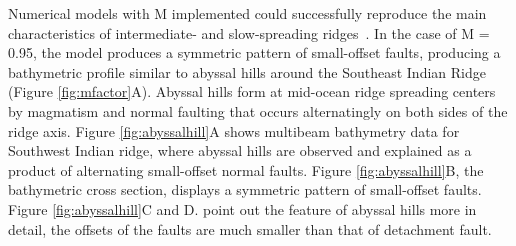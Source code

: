 \documentclass[letterpaper,12pt,notitle]{memphisthesis}                     %
\begin{document}
Numerical models with M implemented could successfully reproduce the main characteristics of intermediate- and slow-spreading ridges~\citep{Buck2005}. In the case of M = 0.95, the model produces a symmetric pattern of small-offset faults, producing a bathymetric profile similar to abyssal hills around the Southeast Indian Ridge (Figure \ref{fig:mfactor}A). Abyssal hills form at mid-ocean ridge spreading centers by magmatism and normal faulting that occurs alternatingly on both sides of the ridge axis. Figure \ref{fig:abyssalhill}A shows multibeam bathymetry data for Southwest Indian ridge, where abyssal hills are observed and explained as a product of alternating small-offset normal faults. Figure \ref{fig:abyssalhill}B, the bathymetric cross section, displays a symmetric pattern of small-offset faults. Figure \ref{fig:abyssalhill}C and D. point out the feature of abyssal hills more in detail, the offsets of the faults are much smaller than that of detachment fault.
%
\end{document}
